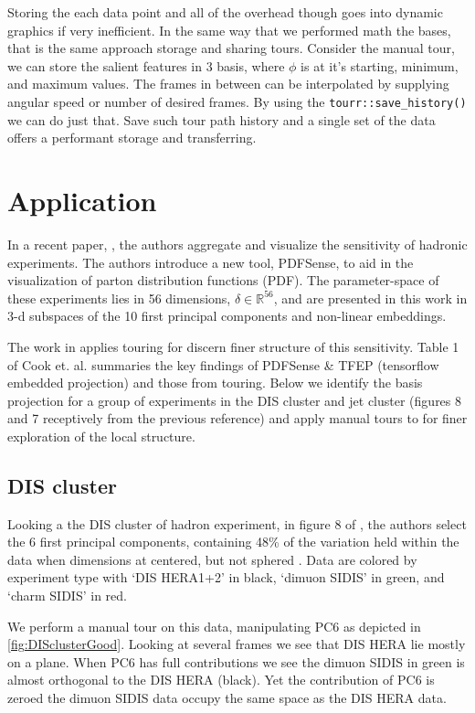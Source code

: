 \documentclass{monashthesis}
\begin{document}
Storing the each data point and all of the overhead though goes into
dynamic graphics if very inefficient. In the same way that we performed
math the bases, that is the same approach storage and sharing tours.
Consider the manual tour, we can store the salient features in 3 basis,
where \(\phi\) is at it's starting, minimum, and maximum values. The
frames in between can be interpolated by supplying angular speed or
number of desired frames. By using the \texttt{tourr::save\_history()}
we can do just that. Save such tour path history and a single set of the
data offers a performant storage and transferring.

\section{Application}\label{sec:application}

In a recent paper, \textcite{wang_visualizing_2018}, the authors
aggregate and visualize the sensitivity of hadronic experiments. The
authors introduce a new tool, PDFSense, to aid in the visualization of
parton distribution functions (PDF). The parameter-space of these
experiments lies in 56 dimensions, \(\delta \in \mathbb{R}^{56}\), and
are presented in this work in 3-d subspaces of the 10 first principal
components and non-linear embeddings.

The work in \textcite{cook_dynamical_2018} applies touring for discern
finer structure of this sensitivity. Table 1 of Cook et. al. summaries
the key findings of PDFSense \& TFEP (tensorflow embedded projection)
and those from touring. Below we identify the basis projection for a
group of experiments in the DIS cluster and jet cluster (figures 8 and 7
receptively from the previous reference) and apply manual tours to for
finer exploration of the local structure.

\subsection{DIS cluster}\label{dis-cluster}

Looking a the DIS cluster of hadron experiment, in figure 8 of
\textcite{cook_dynamical_2018}, the authors select the 6 first principal
components, containing 48\% of the variation held within the data when
dimensions at centered, but not sphered . Data are colored by experiment
type with `DIS HERA1+2' in black, `dimuon SIDIS' in green, and `charm
SIDIS' in red.

We perform a manual tour on this data, manipulating PC6 as depicted in
\ref{fig:DISclusterGood}. Looking at several frames we see that DIS HERA
lie mostly on a plane. When PC6 has full contributions we see the dimuon
SIDIS in green is almost orthogonal to the DIS HERA (black). Yet the
contribution of PC6 is zeroed the dimuon SIDIS data occupy the same
space as the DIS HERA data.
\end{document}
